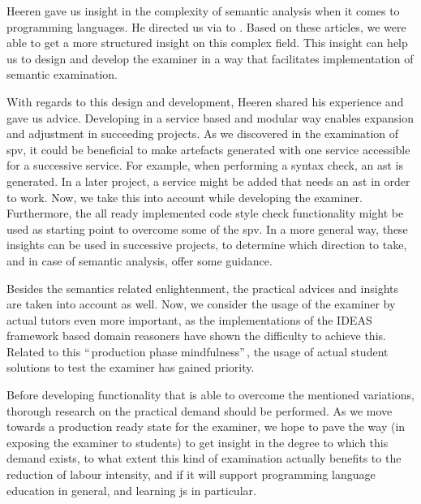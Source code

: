 Heeren gave us insight in the complexity of semantic analysis when it comes to
programming languages. He directed us via \citep{keuning2014strategy} to 
\citep{xu2003transformation}. Based on these articles, we were able to get a
more structured insight on this complex field. This insight can help us to 
design and develop the \gls{examiner} in a way that facilitates implementation 
of semantic examination.


With regards to this design and development, Heeren shared his experience and
gave us advice. Developing in a service based and modular way enables expansion
and adjustment in succeeding projects. As we discovered in the examination of 
\gls{spv}, it could be beneficial to make artefacts generated with one 
service accessible for a successive service. For example, when performing a
syntax check, an \gls{ast} is generated. In a later project, a service
might be added that needs an \gls{ast} in order to work. Now, we take this into
account while developing the \gls{examiner}. Furthermore, the all ready 
implemented code style check functionality might be used as starting point to
overcome some of the \gls{spv}. In a more general way, these insights can be
used in successive projects, to determine which direction to take, and in case
of semantic analysis, offer some guidance.


Besides the semantics related enlightenment, the practical advices and insights
are taken into account as well. Now, we consider the usage of the 
\gls{examiner} by actual \glspl{tutor} even more important, as the 
implementations of the IDEAS framework based domain reasoners have shown the
difficulty to achieve this. Related to this ``\,production phase mindfulness''\,, 
the usage of actual student solutions to test the \gls{examiner} has gained 
priority. 


Before developing functionality that is able to overcome the mentioned 
variations, thorough research on the practical demand should be performed. 
As we move towards a production ready state for the \gls{examiner},
we hope to pave the way (in exposing the \gls{examiner} to 
students) to get insight in the degree to which this demand exists, to what 
extent this kind of examination actually benefits to the reduction of labour 
intensity, and if it will support programming language education in general,
and learning \gls{js} in particular.
